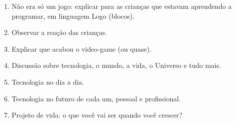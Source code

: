 \begin{enumerate}
	\item Não era só um jogo: explicar para as crianças que estavam aprendendo a programar, em linguagem Logo (blocos).
	\item Observar a reação das crianças.
	\item Explicar que acabou o video-game (ou quase).
	\item Discussão sobre tecnologia, o mundo, a vida, o Universo e tudo mais.
	\item Tecnologia no dia a dia.
	\item Tecnologia no futuro de cada um, pessoal e profissional.
	\item Projeto de vida: o que você vai ser quando você crescer?
\end{enumerate}
